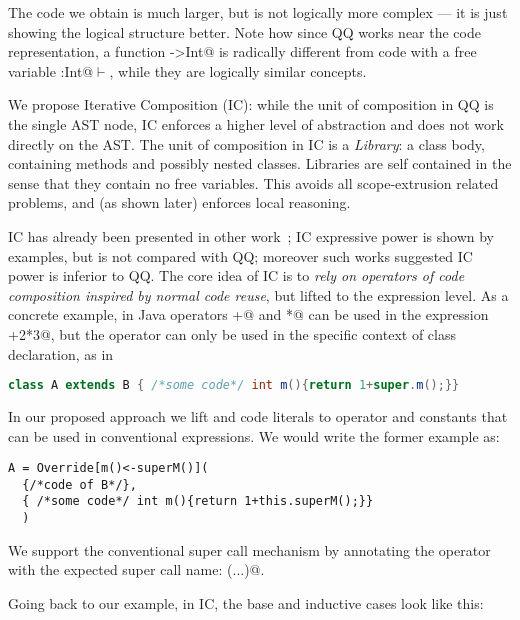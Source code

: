 The code we obtain is much larger, but is not logically more complex --- it is just showing the logical structure better.
Note how since QQ works near the code representation,
a function \Q@Int->Int@ is radically different from
code with a free variable \Q@x:Int@$\vdash$\Q@Int@, while they are 
logically similar concepts.


We propose Iterative Composition (IC):
while the unit of composition in QQ is the single AST node, 
IC enforces a higher level of abstraction and does not work directly on the AST.
The unit of composition in IC is a \emph{Library}:
a class body, containing methods and possibly nested classes.
Libraries are self contained in the sense that they contain no free variables.
This avoids all scope-extrusion related problems, and (as shown later) enforces local reasoning.

IC has already been presented in other work~\cite{servetto2014meta};
 IC expressive power is shown by examples,
but is not compared with QQ; moreover such works suggested IC power is inferior to QQ.
The core idea of IC is to  \emph{rely on  operators of code composition inspired by normal
code reuse}, but lifted to the expression level.
As a concrete example, in Java operators \Q@+@ and \Q@*@ can be used in the expression +2*3@,
but the operator \Q@extends@ can only be used in the specific context of class declaration, as in

\begin{lstlisting}[language=Java]
class A extends B { /*some code*/ int m(){return 1+super.m();}}
\end{lstlisting}

In our proposed approach we lift \Q@extends@ and code literals to operator and constants
that can be used in conventional expressions. We would write the former example as:

\begin{lstlisting}
A = Override[m()<-superM()]( 
  {/*code of B*/},
  { /*some code*/ int m(){return 1+this.superM();}}
  )
\end{lstlisting}

\noindent We support the conventional super call mechanism by annotating the operator with
the expected super call name: \Q@Override[m()<-superM()](...)@.



Going back to our \Q@pow@ example,
in IC, the base and inductive cases look like this:

